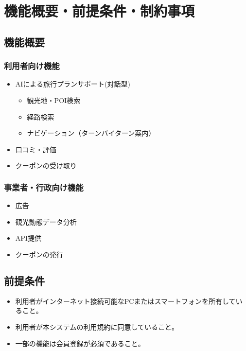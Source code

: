 \documentclass{docs}
\begin{document}
\section{機能概要・前提条件・制約事項}

\subsection{機能概要}
\subsubsection{利用者向け機能}
\begin{itemize}
    \item AIによる旅行プランサポート(対話型)
\begin{itemize}
    \item 観光地・POI検索
    \item 経路検索
    \item ナビゲーション（ターンバイターン案内）
\end{itemize}
    \item 口コミ・評価
    \item クーポンの受け取り
\end{itemize}

\subsubsection{事業者・行政向け機能}
\begin{itemize}
    \item 広告
    \item 観光動態データ分析
    \item API提供
    \item クーポンの発行
\end{itemize}

\subsection{前提条件}
\begin{itemize}
    \item 利用者がインターネット接続可能なPCまたはスマートフォンを所有していること。
    \item 利用者が本システムの利用規約に同意していること。
    \item 一部の機能は会員登録が必須であること。
\end{itemize}
\end{document}
